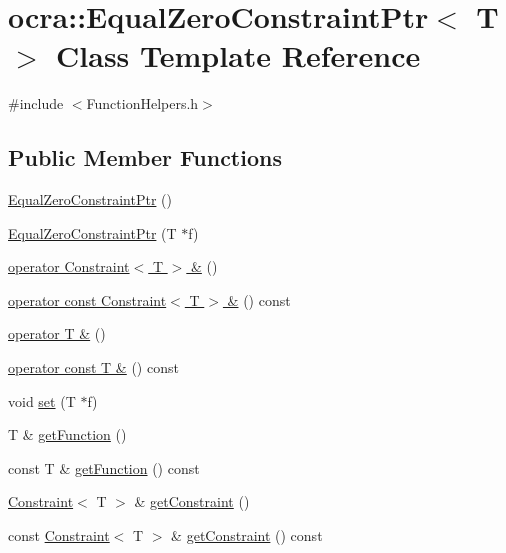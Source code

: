 \hypertarget{classocra_1_1EqualZeroConstraintPtr}{}\section{ocra\+:\+:Equal\+Zero\+Constraint\+Ptr$<$ T $>$ Class Template Reference}
\label{classocra_1_1EqualZeroConstraintPtr}


{\ttfamily \#include $<$Function\+Helpers.\+h$>$}

\subsection*{Public Member Functions}
\begin{DoxyCompactItemize}
\item 
\hyperlink{classocra_1_1EqualZeroConstraintPtr_a3c2ba882cedf01952626c420b3020b8f}{Equal\+Zero\+Constraint\+Ptr} ()
\item 
\hyperlink{classocra_1_1EqualZeroConstraintPtr_a6a3937dc3d22626cb3aaf3536256aee8}{Equal\+Zero\+Constraint\+Ptr} (T $\ast$f)
\item 
\hyperlink{classocra_1_1EqualZeroConstraintPtr_a46f26ad15e3bccb5d1566873f7389e5c}{operator Constraint$<$ T $>$ \&} ()
\item 
\hyperlink{classocra_1_1EqualZeroConstraintPtr_a8b8ad981759d5531f699ee2faf687c91}{operator const Constraint$<$ T $>$ \&} () const
\item 
\hyperlink{classocra_1_1EqualZeroConstraintPtr_a3fbdf66eb7ef747912865e054e61cef6}{operator T \&} ()
\item 
\hyperlink{classocra_1_1EqualZeroConstraintPtr_a19b57497dcdc5241f3f0980bc6ed93e8}{operator const T \&} () const
\item 
void \hyperlink{classocra_1_1EqualZeroConstraintPtr_a3157efd4dbc5db4141fa688fd8032b78}{set} (T $\ast$f)
\item 
T \& \hyperlink{classocra_1_1EqualZeroConstraintPtr_a995f545eace80eb54d79dfcb48d724bd}{get\+Function} ()
\item 
const T \& \hyperlink{classocra_1_1EqualZeroConstraintPtr_a1bda9fdd004966597bca96f60e4c5b91}{get\+Function} () const
\item 
\hyperlink{classocra_1_1Constraint}{Constraint}$<$ T $>$ \& \hyperlink{classocra_1_1EqualZeroConstraintPtr_a4d9b786f79ed2b84fac88e57f3d00404}{get\+Constraint} ()
\item 
const \hyperlink{classocra_1_1Constraint}{Constraint}$<$ T $>$ \& \hyperlink{classocra_1_1EqualZeroConstraintPtr_a0fe913c6749ffdb91e86df3a5b4822a5}{get\+Constraint} () const
\end{DoxyCompactItemize}


